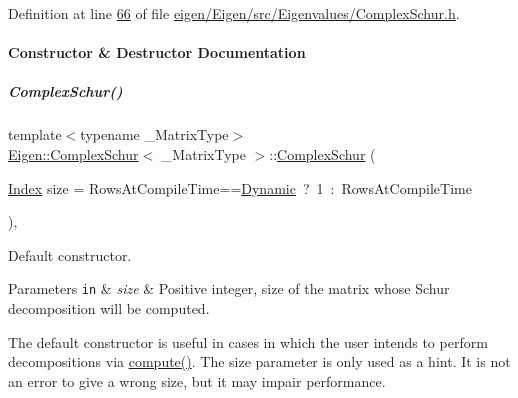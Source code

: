 Definition at line \hyperlink{eigen_2_eigen_2src_2_eigenvalues_2_complex_schur_8h_source_l00066}{66} of file \hyperlink{eigen_2_eigen_2src_2_eigenvalues_2_complex_schur_8h_source}{eigen/\+Eigen/src/\+Eigenvalues/\+Complex\+Schur.\+h}.



\paragraph{Constructor \& Destructor Documentation}
\mbox{\label{group___eigenvalues___module_ad707d9978dc36b3b15e460c2a83f4093}} 
\subparagraph{\texorpdfstring{Complex\+Schur()}{ComplexSchur()}\hspace{0.1cm}{\footnotesize\ttfamily [1/4]}}
{\footnotesize\ttfamily template$<$typename \+\_\+\+Matrix\+Type$>$ \\
\hyperlink{group___eigenvalues___module_class_eigen_1_1_complex_schur}{Eigen\+::\+Complex\+Schur}$<$ \+\_\+\+Matrix\+Type $>$\+::\hyperlink{group___eigenvalues___module_class_eigen_1_1_complex_schur}{Complex\+Schur} (\begin{DoxyParamCaption}\item[{\hyperlink{group___eigenvalues___module_a652104d13723a5b1db2937866a034557}{Index}}]{size = {\ttfamily RowsAtCompileTime==\hyperlink{namespace_eigen_ad81fa7195215a0ce30017dfac309f0b2}{Dynamic}~?~1~\+:~RowsAtCompileTime} }\end{DoxyParamCaption})\hspace{0.3cm}{\ttfamily [inline]}, {\ttfamily [explicit]}}



Default constructor. 


\begin{DoxyParams}[1]{Parameters}
\mbox{\tt in}  & {\em size} & Positive integer, size of the matrix whose Schur decomposition will be computed.\\
\hline
\end{DoxyParams}
The default constructor is useful in cases in which the user intends to perform decompositions via \hyperlink{group___eigenvalues___module_a3543d2c286563108cd9ace672bbb1c09}{compute()}. The {\ttfamily size} parameter is only used as a hint. It is not an error to give a wrong {\ttfamily size}, but it may impair performance.

